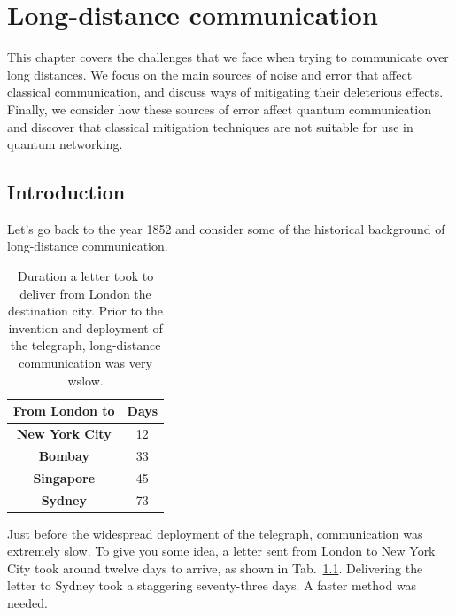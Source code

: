\chapter{Long-distance communication}
\label{sec:11_long-distance}

This chapter covers the challenges that we face when trying to communicate over long distances.
We focus on the main sources of noise and error that affect classical communication, and discuss ways of mitigating their deleterious effects.
Finally, we consider how these sources of error affect quantum communication and discover that classical mitigation techniques are not suitable for use in quantum networking.



\section{Introduction}
\label{sec:ld-intro}

Let's go back to the year 1852 and consider some of the historical background of long-distance communication.
\begin{table}
    \setcellgapes{3pt}
    \renewcommand\theadfont{}
    \makegapedcells
    \centering
    
    \begin{tabular}{cc}
    \hline
    \textbf{From London to} & \textbf{Days} \\
    \hline
    \textbf{New York City} & 12 \\
    \textbf{Bombay} & 33 \\
    \textbf{Singapore} & 45 \\
    \textbf{Sydney} & 73 \\
    \hline
    \end{tabular}
    \caption[Communication before the telegraph.]{Duration a letter took to deliver from London the destination city. Prior to the invention and deployment of the telegraph, long-distance communication was very wslow.}
    \label{tab:london-letter}
\end{table}
Just before the widespread deployment of the telegraph, communication was extremely slow. To give you some idea, a letter sent from London to New York City took around twelve days to arrive, as shown in Tab.~\ref{tab:london-letter}. Delivering the letter to Sydney took a staggering seventy-three days. 
A faster method was needed. 

